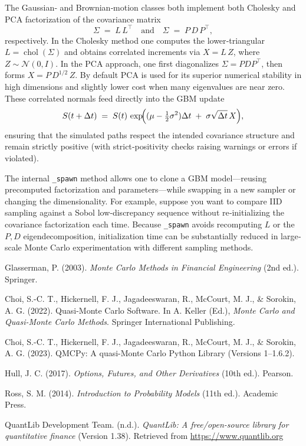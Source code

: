 \documentclass{article}
\begin{document}
 The Gaussian‐ and Brownian‐motion classes both implement both Cholesky and PCA factorization of the covariance matrix
\[
\Sigma \;=\; L\,L^{\!\top}
\quad\text{and}\quad
\Sigma \;=\; P\,D\,P^{\!\top},
\]
respectively.  In the Cholesky method one computes the lower‐triangular $L=\operatorname{chol}(\Sigma)$ and obtains correlated increments via $X=L\,Z$, where $Z\sim\mathcal{N}(0,I)$.  In the PCA approach, one first diagonalizes $\Sigma=PDP^{\!\top}$, then forms $X = P\,D^{1/2}\,Z$.  By default PCA is used for its superior numerical stability in high dimensions and slightly lower cost when many eigenvalues are near zero.  These correlated normals feed directly into the GBM update
\[
S(t+\Delta t) \;=\; S(t)\,\exp\!\Bigl((\mu - \tfrac12\sigma^2)\Delta t \;+\;\sigma\sqrt{\Delta t}\,X\Bigr),
\]
ensuring that the simulated paths respect the intended covariance structure and remain strictly positive (with strict‐positivity checks raising warnings or errors if violated).


The internal \texttt{\_spawn} method allows one to clone a GBM model—reusing precomputed factorization and parameters—while swapping in a new sampler or changing the dimensionality.  For example, suppose you want to compare IID sampling against a Sobol low‐discrepancy sequence without re‐initializing the covariance factorization each time. 
Because \texttt{\_spawn} avoids recomputing $L$ or the $P,D$ eigendecomposition, initialization time can be substantially reduced in large‐scale Monte Carlo experimentation with different sampling methods.


\begin{thebibliography}{6}

Glasserman, P. (2003). \textit{Monte Carlo Methods in Financial Engineering} (2nd ed.). Springer.

Choi, S.-C. T., Hickernell, F. J., Jagadeeswaran, R., McCourt, M. J., \& Sorokin, A. G. (2022).
Quasi-Monte Carlo Software. In A. Keller (Ed.), \textit{Monte Carlo and Quasi-Monte Carlo Methods}.
Springer International Publishing.

Choi, S.-C. T., Hickernell, F. J., Jagadeeswaran, R., McCourt, M. J., \& Sorokin, A. G. (2023).
QMCPy: A quasi-Monte Carlo Python Library (Versions 1–1.6.2).

Hull, J. C. (2017). \textit{Options, Futures, and Other Derivatives} (10th ed.). Pearson.

Ross, S. M. (2014). \textit{Introduction to Probability Models} (11th ed.). Academic Press.

QuantLib Development Team. (n.d.). \textit{QuantLib: A free/open-source library for quantitative finance} (Version 1.38).
Retrieved from \url{https://www.quantlib.org}

\end{thebibliography}


 
\end{document}
